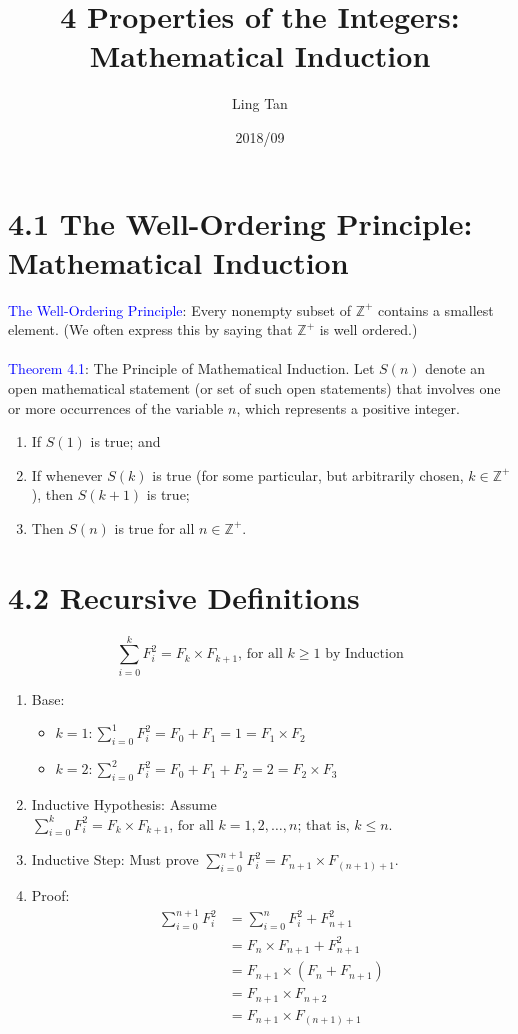 \documentclass[a4paper]{article}
\title{4 Properties of the Integers: Mathematical Induction}
\author{Ling Tan}
\date{2018/09}
\begin{document}
\maketitle

\section*{4.1 The Well-Ordering Principle: Mathematical Induction}
\textcolor{blue}{The Well-Ordering Principle}: Every nonempty subset of $\mathbb{Z}^+$ contains a smallest element. (We often express this by saying that $\mathbb{Z}^+$ is well ordered.)\\
\\
\textcolor{blue}{Theorem 4.1}: The Principle of Mathematical Induction. Let $S(n)$ denote an open mathematical statement (or set of such open statements) that involves one or more occurrences of the variable $n$, which represents a positive integer.
\begin{enumerate}
    \item If $S(1)$ is true; and
    \item If whenever $S(k)$ is true (for some particular, but arbitrarily chosen, $k\in\mathbb{Z}^+$), then $S(k+1)$ is true;
    \item Then $S(n)$ is true for all $n\in\mathbb{Z}^+$.
\end{enumerate}

\section*{4.2 Recursive Definitions}
$$
\sum_{i=0}^k F_i^2=F_k\times F_{k+1}\text{, for all }k\geq1\text{ by Induction}
$$
\begin{enumerate}
    \item Base:
    \begin{itemize}
        \item $k=1: \sum_{i=0}^1 F_i^2=F_0+F_1=1=F_1\times F_2$
        \item $k=2: \sum_{i=0}^2 F_i^2=F_0+F_1+F_2=2=F_2\times F_3$
    \end{itemize}
    \item Inductive Hypothesis: Assume $\sum_{i=0}^k F_i^2=F_k\times F_{k+1}\text{, for all }k=1,2,\dots,n\text{; that is, }k\leq n$.
    \item Inductive Step: Must prove $\sum_{i=0}^{n+1} F_i^2=F_{n+1}\times F_{(n+1)+1}$.
    \item Proof:\\
    \begin{align*}
    \sum_{i=0}^{n+1} F_i^2 & = \sum_{i=0}^{n} F_i^2 + F_{n+1}^2 \\
    & = F_n\times F_{n+1} + F_{n+1}^2 \\ 
    & = F_{n+1}\times (F_n+F_{n+1}) \\ 
    & = F_{n+1}\times F_{n+2} \\ 
    & = F_{n+1}\times F_{(n+1)+1}
    \end{align*}
\end{enumerate}
\end{document}
